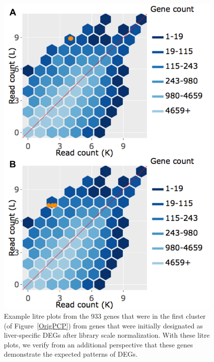 \documentclass{article}
\begin{document}
\null
\begin{figure}[t!]
\centerline{\includegraphics[width=0.7\columnwidth]{../Dashboards/exampleOrig.png}}
\caption{Example litre plots from the 933 genes that were in the first cluster (of Figure~\ref{OrigPCP}) from genes that were initially designated as liver-specific DEGs after library scale normalization. With these litre plots, we verify from an additional perspective that these genes demonstrate the expected patterns of DEGs.
\label{OrigLitre}}
\end{figure}
\end{document}
